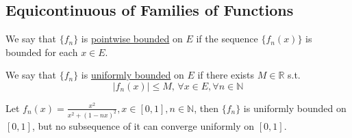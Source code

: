 \subsection{Equicontinuous of Families of Functions}
We say that  $ \{f_n \} $ is \underline{pointwise bounded} on $ E  $ if the sequence  $ \{f_n(x ) \}$ is bounded for each  $ x\in E  $.

We say that  $ \{f_n \} $ is \underline{uniformly bounded} on  $ E  $ if there exists  $ M\in \mathbb{R }   $ s.t.
\[|f_n(x)| \leqslant M,\,\forall x\in E,\forall n\in\mathbb{N } \]
\begin{example}
    Let  $ f_n(x)=\frac{x^2}{x^2+(1-nx)^2},x\in[0,1],n\in\mathbb{N } $, then  $ \{f_n \} $ is uniformly bounded on  $ [0,1] $, but no 
    subsequence of it can converge uniformly on  $ [0,1] $.
\end{example}

